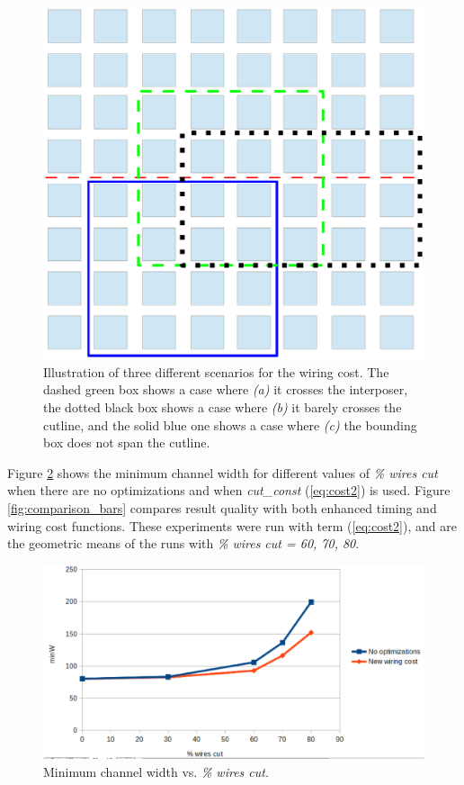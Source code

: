 \documentclass{sig-alternate-2013}
\begin{document}
\begin{figure}[!htbp]
\centering
\includegraphics[width=\linewidth]{bb.eps}
\caption{Illustration of three different scenarios for the wiring cost. The dashed green box shows a case where \textit{(a)} it crosses the interposer, the dotted black box shows a case where \textit{(b)} it barely crosses the cutline, and the solid blue one shows a case where \textit{(c)} the bounding box does not span the cutline.}
\label{fig:bb_illustration}
\end{figure}

Figure \ref{fig:comparison_minW} shows the minimum channel width for different values of \textit{\% wires cut} when there are no optimizations and when \textit{cut\_const} (\ref{eq:cost2}) is used. %
Figure \ref{fig:comparison_bars} compares result quality with both enhanced timing and wiring cost functions. These experiments were run with term (\ref{eq:cost2}), and are the geometric means of the runs with \textit{\% wires cut = 60, 70, 80}. 

\begin{figure}[!htbp]
\centering
\includegraphics[width=\linewidth]{comparison_minW.eps}
\caption{Minimum channel width vs. \textit{\% wires cut}.}
\label{fig:comparison_minW}
\end{figure}
\end{document}
